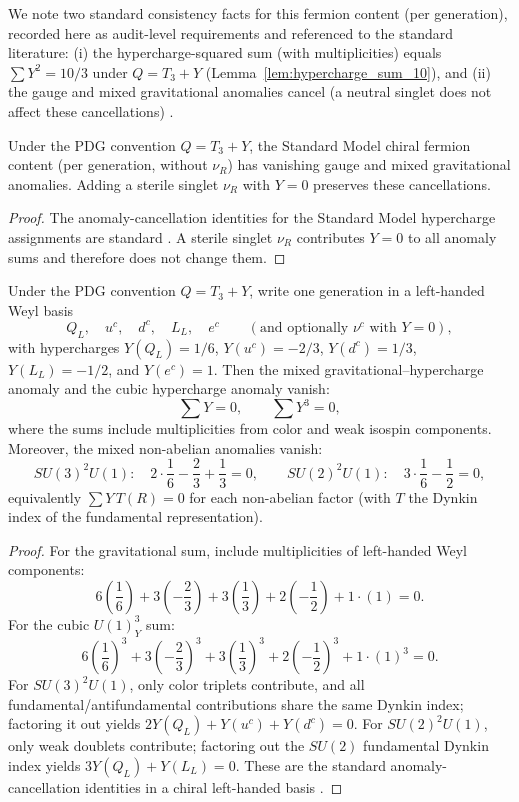 We note two standard consistency facts for this fermion content (per generation), recorded here as audit-level requirements and referenced to the standard literature:
(i) the hypercharge-squared sum (with multiplicities) equals $\sum Y^2=10/3$ under $Q=T_3+Y$ (Lemma~\ref{lem:hypercharge_sum_10}), and
(ii) the gauge and mixed gravitational anomalies cancel (a neutral singlet does not affect these cancellations) \cite{BouchiatIliopoulosMeyer1972,PeskinSchroeder1995,PDGRPP2024}.

\begin{proposition}\label{prop:anomaly_nur}
Under the PDG convention $Q=T_3+Y$, the Standard Model chiral fermion content (per generation, without $\nu_R$) has vanishing gauge and mixed gravitational anomalies.
Adding a sterile singlet $\nu_R$ with $Y=0$ preserves these cancellations.
\end{proposition}
\begin{proof}
The anomaly-cancellation identities for the Standard Model hypercharge assignments are standard \cite{BouchiatIliopoulosMeyer1972,PeskinSchroeder1995,PDGRPP2024}.
A sterile singlet $\nu_R$ contributes $Y=0$ to all anomaly sums and therefore does not change them.
\end{proof}

\begin{lemma}\label{lem:sm_anomaly_sums}
Under the PDG convention $Q=T_3+Y$, write one generation in a left-handed Weyl basis
\[
Q_L,\quad u^c,\quad d^c,\quad L_L,\quad e^c
\qquad (\text{and optionally }\nu^c\text{ with }Y=0),
\]
with hypercharges $Y(Q_L)=1/6$, $Y(u^c)=-2/3$, $Y(d^c)=1/3$, $Y(L_L)=-1/2$, and $Y(e^c)=1$.
Then the mixed gravitational--hypercharge anomaly and the cubic hypercharge anomaly vanish:
\[
\sum Y=0,\qquad \sum Y^3=0,
\]
where the sums include multiplicities from color and weak isospin components.
Moreover, the mixed non-abelian anomalies vanish:
\[
SU(3)^2U(1):\quad 2\cdot \frac{1}{6}-\frac{2}{3}+\frac{1}{3}=0,
\qquad
SU(2)^2U(1):\quad 3\cdot \frac{1}{6}-\frac{1}{2}=0,
\]
equivalently $\sum Y\,T(R)=0$ for each non-abelian factor (with $T$ the Dynkin index of the fundamental representation).
\end{lemma}
\begin{proof}
For the gravitational sum, include multiplicities of left-handed Weyl components:
\[
6\left(\frac{1}{6}\right)+3\left(-\frac{2}{3}\right)+3\left(\frac{1}{3}\right)+2\left(-\frac{1}{2}\right)+1\cdot (1)=0.
\]
For the cubic $U(1)_Y^3$ sum:
\[
6\left(\frac{1}{6}\right)^3+3\left(-\frac{2}{3}\right)^3+3\left(\frac{1}{3}\right)^3+2\left(-\frac{1}{2}\right)^3+1\cdot (1)^3=0.
\]
For $SU(3)^2U(1)$, only color triplets contribute, and all fundamental/antifundamental contributions share the same Dynkin index; factoring it out yields $2Y(Q_L)+Y(u^c)+Y(d^c)=0$.
For $SU(2)^2U(1)$, only weak doublets contribute; factoring out the $SU(2)$ fundamental Dynkin index yields $3Y(Q_L)+Y(L_L)=0$.
These are the standard anomaly-cancellation identities in a chiral left-handed basis \cite{BouchiatIliopoulosMeyer1972,PeskinSchroeder1995,PDGRPP2024}.
\end{proof}

